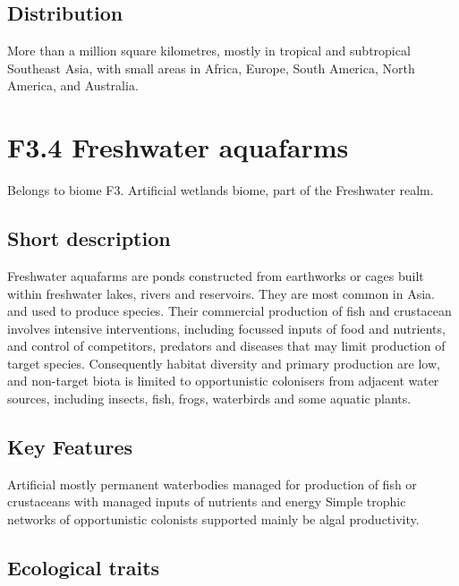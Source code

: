 \documentclass[
  letterpaper,
  DIV=11,
  numbers=noendperiod]{scrartcl}
\begin{document}
\subsection{Distribution}\label{distribution-19}

More than a million square kilometres, mostly in tropical and
subtropical Southeast Asia, with small areas in Africa, Europe, South
America, North America, and Australia.

\section{F3.4 Freshwater aquafarms}\label{f3.4-freshwater-aquafarms}

Belongs to biome F3. Artificial wetlands biome, part of the Freshwater
realm.

\subsection{Short description}\label{short-description-20}

Freshwater aquafarms are ponds constructed from earthworks or cages
built within freshwater lakes, rivers and reservoirs. They are most
common in Asia. and used to produce species. Their commercial production
of fish and crustacean involves intensive interventions, including
focussed inputs of food and nutrients, and control of competitors,
predators and diseases that may limit production of target species.
Consequently habitat diversity and primary production are low, and
non-target biota is limited to opportunistic colonisers from adjacent
water sources, including insects, fish, frogs, waterbirds and some
aquatic plants.

\subsection{Key Features}\label{key-features-20}

Artificial mostly permanent waterbodies managed for production of fish
or crustaceans with managed inputs of nutrients and energy Simple
trophic networks of opportunistic colonists supported mainly be algal
productivity.

\subsection{Ecological traits}\label{ecological-traits-20}
\end{document}
